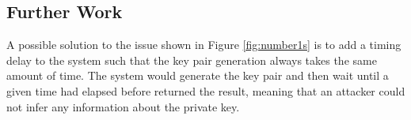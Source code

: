 \documentclass[12pt,a4paper]{article}
\begin{document}
\subsection{Further Work} \noindent
A possible solution to the issue shown in Figure \ref{fig:number1s} is to add a timing delay to the system such that the key pair generation always takes the same amount of time. 
The system would generate the key pair and then wait until a given time had elapsed before returned the result, 
meaning that an attacker could not infer any information about the private key. 




\end{document}
